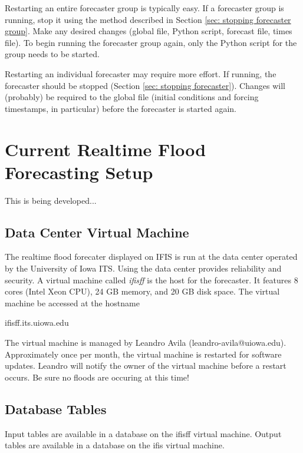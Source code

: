 \documentclass[12pt]{article}
\begin{document}
Restarting an entire forecaster group is typically easy. If a forecaster group is running, stop it using the method described in Section \ref{sec: stopping forecaster group}. Make any desired changes (global file, Python script, forecast file, times file). To begin running the forecaster group again, only the Python script for the group needs to be started.

Restarting an individual forecaster may require more effort. If running, the forecaster should be stopped (Section \ref{sec: stopping forecaster}). Changes will (probably) be required to the global file (initial conditions and forcing timestamps, in particular) before the forecaster is started again.

\section{Current Realtime Flood Forecasting Setup} \label{sec: current realtime flood forecasting setup}

This is being developed...

\subsection{Data Center Virtual Machine} \label{sec: data center}

The realtime flood forecater displayed on IFIS is run at the data center operated by the University of Iowa ITS. Using the data center provides reliability and security. A virtual machine called \emph{ifisff} is the host for the forecaster. It features 8 cores (Intel Xeon CPU), 24 GB memory, and 20 GB disk space. The virtual machine be accessed at the hostname
\begin{center}
 ifisff.its.uiowa.edu
\end{center}
The virtual machine is managed by Leandro Avila (leandro-avila@uiowa.edu). Approximately once per month, the virtual machine is restarted for software updates. Leandro will notify the owner of the virtual machine before a restart occurs. Be sure no floods are occuring at this time!

\subsection{Database Tables} \label{sec: database tables}

Input tables are available in a database on the ifisff virtual machine. Output tables are available in a database on the ifis virtual machine.
\end{document}
